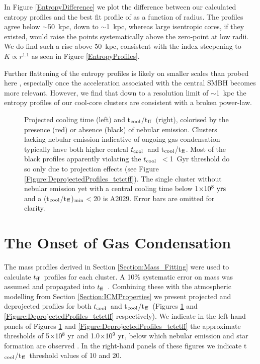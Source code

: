 \documentclass[twocolumn]{aastex6}
\newcommand{\tctff}{{t$_{\rm cool}$/t$_{\rm ff}$}}
\newcommand{\tctffmin}{(\tctff)$_{\rm min}$}
\newcommand{\tc}{$t_{\rm cool}$}
\newcommand{\tff}{$t_{\rm ff}$}
\begin{document}
In Figure \ref{EntropyDifference} we plot the difference between our calculated entropy profiles and the best fit profile of \citet[][]{Panagoulia14a} as a function of radius.  The profiles agree below $\sim$50~kpc, down to $\sim$1~kpc, whereas large isentropic cores, if they existed, would raise the points systematically above the zero-point at low radii.  We do find such a rise above 50~kpc, consistent with the index steepening to $K \propto r^{1.1}$ as seen in Figure \ref{EntropyProfiles}.

Further flattening of the entropy profiles is likely on smaller scales than probed here \cite[see e.g.][]{Donahue06}, especially once the acceleration associated with the central SMBH becomes more relevant.  However, we find that down to a resolution limit of $\sim$1~kpc the entropy profiles of our cool-core clusters are consistent with a broken power-law. 

\begin{figure*}    
  \centering
  \caption{Projected cooling time (left) and \tctff\ (right), colorised by the presence (red) or absence (black) of nebular emission.  Clusters lacking nebular emission indicative of ongoing gas condensation typically have both higher central \tc\ and \tctff.  Most of the black profiles apparently violating the \tc\ $<$1~Gyr threshold do so only due to projection effects (see Figure \ref{Figure:DeprojectedProfiles_tctctff}).  The single cluster without nebular emission yet with a central cooling time below 1$\times10^{8}~{\rm yrs}$ and a \tctffmin$<$20 is A2029.  Error bars are omitted for clarity.}
 \label{Figure:ProjectedProfiles_tctctff}
\end{figure*}

\section{The Onset of Gas Condensation} \label{Section:CoolingInstabilities}

The mass profiles derived in Section \ref{Section:Mass_Fitting} were used to calculate \tff\ profiles for each cluster.  A 10\% systematic error on mass was assumed and propagated into \tff\ \cite[see][]{Hogan17}.  Combining these with the atmospheric modelling from Section \ref{Section:ICMProperties} we present projected and deprojected profiles for both \tc\ and \tctff\  (Figures \ref{Figure:ProjectedProfiles_tctctff} and \ref{Figure:DeprojectedProfiles_tctctff} respectively).  We indicate in the left-hand panels of Figures \ref{Figure:ProjectedProfiles_tctctff} and \ref{Figure:DeprojectedProfiles_tctctff} the approximate thresholds of 5$\times10^{8}~{\rm yr}$ and 1.0$\times10^{9}~{\rm yr}$, below which nebular emission and star formation are observed \cite[][]{Cavagnolo08,Rafferty08}.  In the right-hand panels of these figures we indicate \tctff\ threshold values of 10 and 20.
\end{document}
